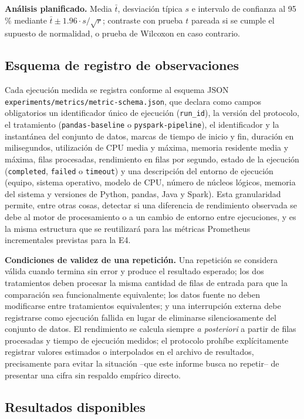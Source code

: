 \documentclass[10pt,twocolumn]{article}
\begin{document}
\textbf{Análisis planificado.} Media $\bar t$, desviación típica $s$ e
intervalo de confianza al 95\,\% mediante
$\bar t \pm 1.96 \cdot s/\sqrt{r}$; contraste con prueba $t$ pareada si se
cumple el supuesto de normalidad, o prueba de Wilcoxon en caso contrario.

\subsection{Esquema de registro de observaciones}

Cada ejecución medida se registra conforme al esquema JSON
\texttt{experiments/metrics/metric-schema.json}, que declara como campos
obligatorios un identificador único de ejecución (\texttt{run\_id}), la
versión del protocolo, el tratamiento (\texttt{pandas-baseline} o
\texttt{pyspark-pipeline}), el identificador y la instantánea del conjunto
de datos, marcas de tiempo de inicio y fin, duración en milisegundos,
utilización de CPU media y máxima, memoria residente media y máxima, filas
procesadas, rendimiento en filas por segundo, estado de la ejecución
(\texttt{completed}, \texttt{failed} o \texttt{timeout}) y una descripción
del entorno de ejecución (equipo, sistema operativo, modelo de CPU, número
de núcleos lógicos, memoria del sistema y versiones de Python, pandas, Java
y Spark). Esta granularidad permite, entre otras cosas, detectar si una
diferencia de rendimiento observada se debe al motor de procesamiento o a
un cambio de entorno entre ejecuciones, y es la misma estructura que se
reutilizará para las métricas Prometheus incrementales previstas para la
E4.

\textbf{Condiciones de validez de una repetición.} Una repetición se
considera válida cuando termina sin error y produce el resultado esperado;
los dos tratamientos deben procesar la misma cantidad de filas de entrada
para que la comparación sea funcionalmente equivalente; los datos fuente no
deben modificarse entre tratamientos equivalentes; y una interrupción
externa debe registrarse como ejecución fallida en lugar de eliminarse
silenciosamente del conjunto de datos. El rendimiento se calcula siempre
\emph{a posteriori} a partir de filas procesadas y tiempo de ejecución
medidos; el protocolo prohíbe explícitamente registrar valores estimados o
interpolados en el archivo de resultados, precisamente para evitar la
situación --que este informe busca no repetir-- de presentar una cifra sin
respaldo empírico directo.

\subsection{Resultados disponibles}
\end{document}
